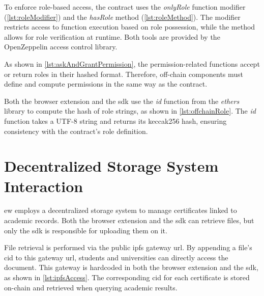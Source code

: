To enforce role-based access, the contract uses the \textit{onlyRole} function modifier (\cref{lst:roleModifier}) and the \textit{hasRole} method (\cref{lst:roleMethod}). The modifier restricts access to function execution based on role possession, while the method allows for role verification at runtime. Both tools are provided by the OpenZeppelin access control library.



As shown in \cref{lst:askAndGrantPermission}, the permission-related functions accept or return roles in their \gls{hash}ed format. Therefore, off-chain components must define and compute permissions in the same way as the contract.


Both the browser extension and the \acrshort{sdk} use the \textit{id} function from the \textit{ethers} library to compute the \gls{hash} of role strings, as shown in \cref{lst:offchainRole}. The \textit{id} function takes a UTF-8 string and returns its \Gls{keccak256} \gls{hash}, ensuring consistency with the contract's role definition.   


\section{Decentralized Storage System Interaction}
\label{sec:decentralizedStorageImpl}
\acrlong{ew} employs a decentralized storage system to manage certificates linked to academic records. Both the browser extension and the \acrshort{sdk} can retrieve files, but only the \acrshort{sdk} is responsible for uploading them on it.

File retrieval is performed via the public \acrshort{ipfs} gateway \acrshort{url}. By appending a file's \acrshort{cid} to this gateway \acrshort{url}, students and universities can directly access the document. This gateway is hardcoded in both the browser extension and the \acrshort{sdk}, as shown in \cref{lst:ipfsAccess}. The corresponding \acrshort{cid} for each certificate is stored on-chain and retrieved when querying academic results.


